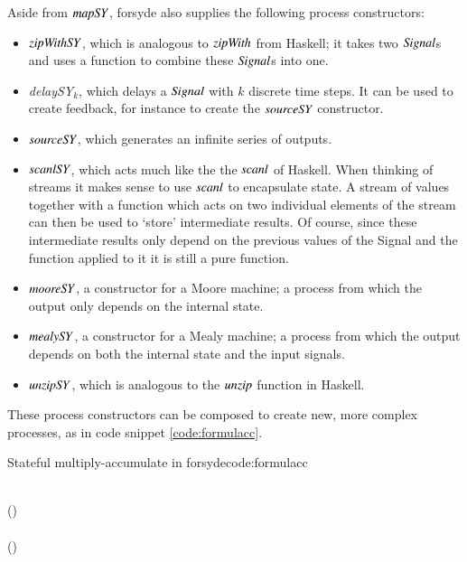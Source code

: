 Aside from \ensuremath{\Varid{mapSY}}, \gls{forsyde} also supplies the following process constructors:
\begin{itemize}
 \item \ensuremath{\Varid{zipWithSY}}, which is analogous to \ensuremath{\Varid{zipWith}} from Haskell; it takes two \ensuremath{\Conid{Signal}}s and uses a function to combine these \ensuremath{\Conid{Signal}}s into one.
\item \textit{delaySY$_k$}, which delays a \ensuremath{\Conid{Signal}} with $k$ discrete time steps. It can be used to create feedback, for instance to create the \ensuremath{\Varid{sourceSY}} constructor.
\item \ensuremath{\Varid{sourceSY}}, which generates an infinite series of outputs.
\item \ensuremath{\Varid{scanlSY}}, which acts much like the the \ensuremath{\Varid{scanl}} of Haskell. 
When thinking of streams it makes sense to use \ensuremath{\Varid{scanl}} to encapsulate state. 
A stream of values together with a function which acts on two individual elements of the stream can then be used to `store' intermediate results. 
Of course, since these intermediate results only depend on the previous values of the Signal and the function applied to it it is still a pure function. 
\item \ensuremath{\Varid{mooreSY}}, a constructor for a Moore machine; a process from which the output only depends on the internal state.
\item \ensuremath{\Varid{mealySY}}, a constructor for a Mealy machine; a process from which the output depends on both the internal state and the input signals.
\item \ensuremath{\Varid{unzipSY}}, which is analogous to the \ensuremath{\Varid{unzip}} function in Haskell. 
\end{itemize}

These process constructors can be composed to create new, more complex processes, as in code snippet \ref{code:formulacc}.
\begin{texexptitled}{Stateful multiply-accumulate in \gls{forsyde}}{code:formulacc}
\begin{hscode}\SaveRestoreHook
{}%
%
%
%
\>[B]{}\mathbin{::}\;\Rightarrow {}\;\to {}\;\to {}\;\<[E]%
\\
\>[B]{}\;\;\mathrel{=}\;(\mathbin{+})\;\;\<[E]%
\\
\>[B]{}\<[5]%
\>[5]{}\<[E]%
\\
\>[5]{}\<[9]%
\>[9]{}\mathrel{=}\;(\mathbin{*})\;\;\<[E]%
\ColumnHook
\end{hscode}\resethooks
\end{texexptitled}

